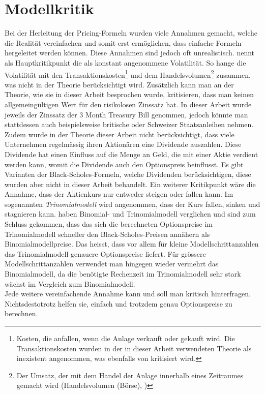 \documentclass[11pt]{report} %
\begin{document}
\section{Modellkritik}
Bei der Herleitung der Pricing-Formeln wurden viele Annahmen gemacht, welche die Realität vereinfachen und somit erst ermöglichen, dass einfache Formeln hergeleitet werden können. Diese Annahmen sind jedoch oft unrealistisch. \textcite{Janková2018} nennt als Hauptkritikpunkt die als konstant angenommene Volatilität. So hange die Volatilität mit den Transaktionskosten\footnote{Kosten, die anfallen, wenn die Anlage verkauft oder gekauft wird. Die Transaktionskosten wurden in der in dieser Arbeit verwendeten Theorie als inexistent angenommen, was ebenfalls von \textcite{Janková2018} kritisiert wird.} und dem Handelsvolumen\footnote{Der Umsatz, der mit dem Handel der Anlage innerhalb eines Zeitraumes gemacht wird (Handelsvolumen (Börse), \cite{wikihandelsvolumen2023})} zusammen, was nicht in der Theorie berücksichtigt wird. Zusätzlich kann man an der Theorie, wie sie in dieser Arbeit besprochen wurde, kritisieren, dass man keinen allgemeingültigen Wert für den risikolosen Zinssatz hat. In dieser Arbeit wurde jeweils der Zinssatz der 3 Month Treasury Bill genommen, jedoch könnte man stattdessen auch beispielsweise britische oder Schweizer Staatsanleihen nehmen. Zudem wurde in der Theorie dieser Arbeit nicht berücksichtigt, dass viele Unternehmen regelmässig ihren Aktionären eine Dividende auszahlen. Diese Dividende hat einen Einfluss auf die Menge an Geld, die mit einer Aktie verdient werden kann, womit die Dividende auch den Optionspreis beinflusst. Es gibt Varianten der Black-Scholes-Formeln, welche Dividenden berücksichtigen, diese wurden aber nicht in dieser Arbeit behandelt. Ein weiterer Kritikpunkt wäre die Annahme, dass der Aktienkurs nur entweder steigen oder fallen kann. Im sogenannten \textit{Trinomialmodell} wird angenommen, dass der Kurs fallen, sinken und stagnieren kann. \textcite{Josheski2020} haben Binomial- und Trinomialmodell verglichen und sind zum Schluss gekommen, dass das sich die berechneten Optionspreise im Trinomialmodell schneller den Black-Scholes-Preisen annähern als Binomialmodellpreise. Das heisst, dass vor allem für kleine Modellschrittanzahlen das Trinomialmodell genauere Optionspreise liefert. Für grössere Modellschrittanzahlen verwendet man hingegen wieder vermehrt das Binomialmodell, da die benötigte Rechenzeit im Trinomialmodell sehr stark wächst im Vergleich zum Binomialmodell.
\\Jede weitere vereinfachende Annahme kann und soll man kritisch hinterfragen. Nichtsdestotrotz helfen sie, einfach und trotzdem genau Optionspreise zu berechnen. 
\end{document}
